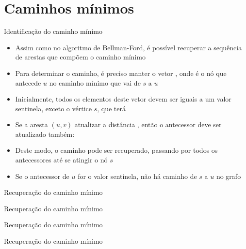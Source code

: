 \section{Caminhos mínimos}

\begin{frame}[fragile]{Identificação do caminho mínimo}

    \begin{itemize}
        \item Assim como no algoritmo de Bellman-Ford, é possível recuperar a sequência de 
            arestas que compõem o caminho mínimo

        \item Para determinar o caminho, é preciso manter o vetor , onde
             é o nó que antecede $u$ no caminho mínimo que vai de $s$ a 
            $u$

        \item Inicialmente, todos os elementos deste vetor devem ser iguais a um valor sentinela,
            exceto o vértice $s$, que terá 

        \item Se a aresta $(u, v)$ atualizar a distância , então o 
            antecessor deve ser atualizado também: 

        \item Deste modo, o caminho pode ser recuperado, passando por todos os antecessores até
            se atingir o nó $s$

        \item Se o antecessor de $u$ for o valor sentinela, não há caminho de $s$ a $u$ no
            grafo
    \end{itemize}

\end{frame}

\begin{frame}[fragile]{Recuperação do caminho mínimo}
\end{frame}

\begin{frame}[fragile]{Recuperação do caminho mínimo}
\end{frame}

\begin{frame}[fragile]{Recuperação do caminho mínimo}
\end{frame}

\begin{frame}[fragile]{Recuperação do caminho mínimo}
\end{frame}
